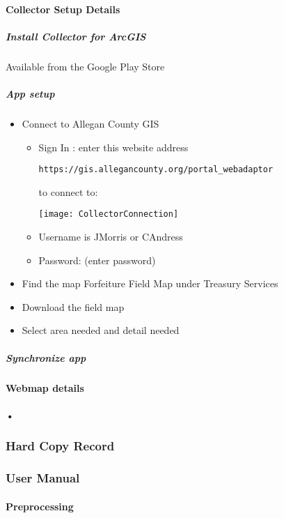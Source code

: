 \documentclass[class=article , crop=false, titlepage, twoside, multi={itemize, figure, verbatim}, float=false]{standalone}
\begin{document}
\paragraph{Collector Setup Details}
\subparagraph{Install Collector for ArcGIS} Available from the Google Play Store
\subparagraph{App setup}\begin{itemize}
\item Connect to Allegan County GIS
\begin{itemize}
\item Sign In : enter this website address
\begin{verbatim}
https://gis.allegancounty.org/portal_webadaptor
\end{verbatim}
to connect to:
\begin{center}
    \texttt{[image: CollectorConnection]}
    \label{img:g}
\end{center}
\item Username is JMorris or CAndress
\item Password: (enter password)
\end{itemize}
\item Find the map Forfeiture Field Map under Treasury Services
\item Download the field map
\item Select area needed and detail needed


\end{itemize}


\subparagraph{Synchronize app}

\paragraph{Webmap details}


\paragraph{•}



\clearpage
\subsubsection{Hard Copy Record}
\clearpage
\subsubsection{User Manual}
\paragraph{Preprocessing}
\end{document}
